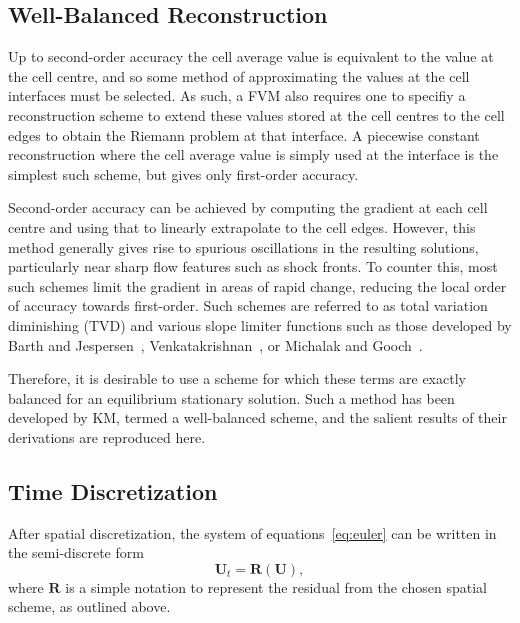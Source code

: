 \subsection{Well-Balanced Reconstruction}
\label{subsec:wellBalanced}

Up to second-order accuracy the cell average value is equivalent to the value at the cell centre, and so some method of approximating the values at the cell interfaces must be selected. As such, a FVM also requires one to specifiy a reconstruction scheme to extend these values stored at the cell centres to the cell edges to obtain the Riemann problem at that interface. A piecewise constant reconstruction where the cell average value is simply used at the interface is the simplest such scheme, but gives only first-order accuracy.

Second-order accuracy can be achieved by computing the gradient at each cell centre and using that to linearly extrapolate to the cell edges. However, this method generally gives rise to spurious oscillations in the resulting solutions, particularly near sharp flow features such as shock fronts. To counter this, most such schemes limit the gradient in areas of rapid change, reducing the local order of accuracy towards first-order. Such schemes are referred to as total variation diminishing (TVD) and various slope limiter functions such as those developed by Barth and Jespersen~\cite{Barth1989}, Venkatakrishnan~\cite{Venkatakrishnan1993,Venkatakrishnan1995}, or Michalak and Gooch~\cite{Michalak2008}.

Therefore, it is desirable to use a scheme for which these terms are exactly balanced for an equilibrium stationary solution. Such a method has been developed by KM, termed a well-balanced scheme, and the salient results of their derivations are reproduced here.

\subsection{Time Discretization}
\label{subsec:time}

After spatial discretization, the system of equations~\eqref{eq:euler} can be written in the semi-discrete form
\begin{equation}
\mathbf{U}_t=\mathbf{R}(\mathbf{U}),
\end{equation}
where $\mathbf{R}$ is a simple notation to represent the residual from the chosen spatial scheme, as outlined above.

